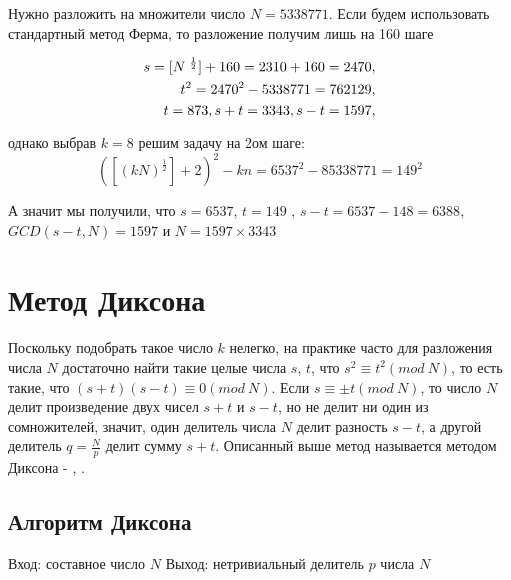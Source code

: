   \begin{example}
    Нужно разложить на множители число $N = 5338771$. Если будем использовать стандартный метод Ферма, то разложение получим лишь на 160 шаге
    
      \begin{subequations}
	\begin{align}
	  s = [N\textsuperscript{ {$\frac{1}{2}$}}] + 160 = 2310 + 160 = 2470, \\
	  t\textsuperscript{2} = 2470\textsuperscript{2} - 5338771 = 762129, \\
	  t = 873, s + t = 3343, s - t = 1597, 
       \end{align}
      \end{subequations}	
    
    однако выбрав $k = 8$ решим задачу на 2ом шаге: 
      \begin{equation}
       ([(kN)^{ \frac{1}{2}}] + 2)^{2} - k n = 6537^{2} - 8 5338771 = 149^{2}
      \end{equation}	
	
    А значит мы получили, что $s = 6537$, $t = 149$ , $s - t = 6537 - 148 = 6388$, $GCD(s - t, N) = 1597$ и $N = 1597 \times 3343$
  \end{example}


\section{Метод Диксона}

\paragraph{} Поскольку подобрать такое число $k$ нелегко, на практике часто для разложения числа $N$ достаточно найти такие целые числа $s$,
$t$, что $s^{2} \equiv t^{2}(mod \: N)$, то есть такие, что $(s + t)(s - t) \equiv 0 (mod \: N)$. 
Если $s \equiv \pm t(mod \: N)$, то число $N$ делит произведение двух чисел $s + t$ и $s - t$, но не делит ни один 
из сомножителей, значит, один делитель числа $N$ делит разность $s - t$, а другой делитель $q = \frac{N}{p}$ делит сумму $s + t$.
Описанный выше метод называется методом Диксона - \cite[Глава 4.1, страницы 115-117]{ish11}, \cite[Глава 6.4, страницы 218-219]{mah06}.

  \subsection{Алгоритм Диксона}
  Вход: составное число $N$
  Выход: нетривиальный делитель $p$ числа $N$
  
